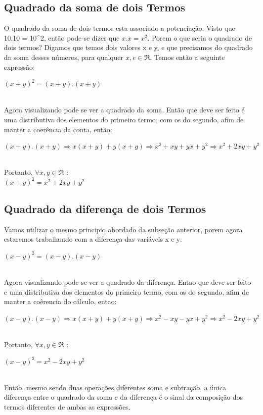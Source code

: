 \documentclass[a4paper,12pt,twoside,BCOR=10mm]{scrbook}
\begin{document}
\begin{titlepage}
\subsection{Quadrado da soma de dois Termos}
O quadrado da soma de dois termos esta associado a potenciação. Visto que 10.10 = 10^{2}, então pode-se dizer que $x.x =  x^{2}$. Porem o que seria o quadrado de dois termos? Digamos que temos dois valores x e y, e que precisamos do quadrado da soma desses números, para qualquer $x,e \in \Re$. Temos então a seguinte expressão:
\\
 
\begin{center}
 $(x + y)^{2} = (x + y).(x + y)$
\end{center} 
\\
Agora visualizando pode se ver a quadrado da soma. Então que deve ser feito é uma distributiva dos elementos do primeiro termo, com os do segundo, afim de manter a coerência da conta, então:
\\
\begin{center}
$(x + y).(x + y) \Rightarrow x(x + y) + y(x + y) \Rightarrow x^{2} + xy + yx + y^{2} \Rightarrow x^{2} + 2xy + y^{2}$
\end{center}
\\
Portanto, $\forall x,y \in \Re$  :
\\
$(x + y)^{2} = x^{2} + 2xy + y^{2}$


\subsection{Quadrado da diferença de dois Termos}
Vamos utilizar o mesmo principio abordado da subseção anterior, porem agora estaremos trabalhando com a diferença das variáveis x e y: 
\begin{center}
$(x - y)^{2} = (x - y).(x - y)$ 
\end{center}
\\
Agora visualizando pode se ver a quadrado da diferença. Entao que deve ser feito e uma distributiva dos elementos do primeiro termo, com os do segundo, afim de manter a coêrencia do cálculo, entao:
\\
\begin{center}
$(x - y).(x - y) \Rightarrow x(x + y) + y(x + y) \Rightarrow x^{2} - xy - yx + y^{2} \Rightarrow x^{2} - 2xy + y^{2}$
\end{center}
\\
Portanto, $\forall x,y \in \Re$  :
\\
\begin{center}
$(x - y)^{2} = x^{2} - 2xy + y^{2}$
\end{center} 
\\
Então, mesmo sendo duas operações diferentes soma e subtração, a única diferença entre o quadrado da soma e da diferença é o sinal da composição dos termos diferentes de ambas as expressões.

\end{titlepage}
\end{document}
